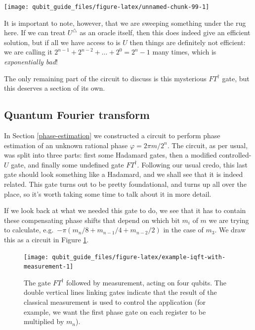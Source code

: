 \documentclass[fleqn,a4paper]{article}
\theoremstyle{definition}
\theoremstyle{definition}
\theoremstyle{definition}
\theoremstyle{definition}
\theoremstyle{remark}
\begin{document}
\begin{center}\texttt{[image: qubit\_guide\_files/figure-latex/unnamed-chunk-99-1]} \end{center}

It is important to note, however, that we are sweeping something under the rug here.
If we can treat \(U^\triangle\) as an oracle itself, then this does indeed give an efficient solution, but if all we have access to is \(U\) then things are definitely not efficient: we are calling it \(2^{n-1}+2^{n-2}+\ldots+2^0=2^n-1\) many times, which is \emph{exponentially bad}!

The only remaining part of the circuit to discuss is this mysterious \(FT^\dagger\) gate, but this deserves a section of its own.

\hypertarget{quantum-fourier-transform}{%
\subsection{Quantum Fourier transform}\label{quantum-fourier-transform}}

In Section \ref{phase-estimation} we constructed a circuit to perform phase estimation of an unknown rational phase \(\varphi=2\pi m/2^n\).
The circuit, as per usual, was split into three parts: first some Hadamard gates, then a modified controlled-\(U\) gate, and finally some undefined gate \(FT^\dagger\).
Following our usual credo, this last gate should look something like a Hadamard, and we shall see that it is indeed related.
This gate turns out to be pretty foundational, and turns up all over the place, so it's worth taking some time to talk about it in more detail.

If we look back at what we needed this gate to do, we see that it has to contain these compensating phase shifts that depend on which bit \(m_i\) of \(m\) we are trying to calculate, e.g.~\(-\pi(m_n/8+m_{n-1}/4+m_{n-2}/2)\) in the case of \(m_3\).
We draw this as a circuit in Figure \ref{fig:example-iqft-with-measurement}.



\begin{figure}[H]

{\centering \texttt{[image: qubit\_guide\_files/figure-latex/example-iqft-with-measurement-1]} 

}

\caption{The gate \(FT^\dagger\) followed by measurement, acting on four qubits. The double vertical lines linking gates indicate that the result of the classical measurement is used to control the application (for example, we want the first phase gate on each register to be multiplied by \(m_n\)).}\label{fig:example-iqft-with-measurement}
\end{figure}
\end{document}
